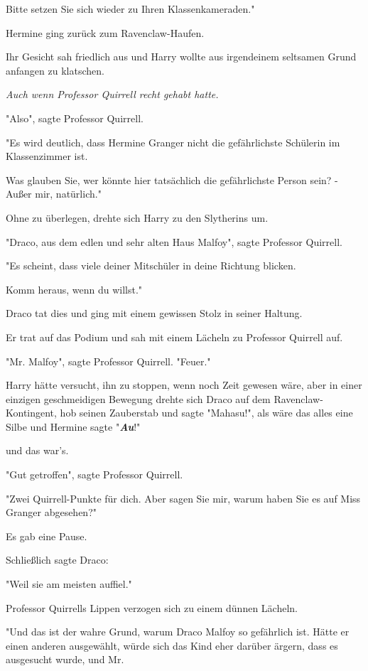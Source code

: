 {Bitte setzen Sie sich wieder zu Ihren Klassenkameraden."

Hermine ging zurück zum Ravenclaw-Haufen.

Ihr Gesicht sah friedlich aus und Harry wollte aus irgendeinem seltsamen Grund anfangen zu klatschen.

\emph{Auch wenn Professor Quirrell recht gehabt hatte.}

"Also", sagte Professor Quirrell.

"Es wird deutlich, dass Hermine Granger nicht die gefährlichste Schülerin im Klassenzimmer ist.

Was glauben Sie, wer könnte hier tatsächlich die gefährlichste Person sein? - Außer mir, natürlich."

Ohne zu überlegen, drehte sich Harry zu den Slytherins um.

"Draco, aus dem edlen und sehr alten Haus Malfoy", sagte Professor Quirrell.

"Es scheint, dass viele deiner Mitschüler in deine Richtung blicken.

Komm heraus, wenn du willst."

Draco tat dies und ging mit einem gewissen Stolz in seiner Haltung.

Er trat auf das Podium und sah mit einem Lächeln zu Professor Quirrell auf.

"Mr. Malfoy", sagte Professor Quirrell. "Feuer."

Harry hätte versucht, ihn zu stoppen, wenn noch Zeit gewesen wäre, aber in einer einzigen geschmeidigen Bewegung drehte sich Draco auf dem Ravenclaw-Kontingent, hob seinen Zauberstab und sagte "Mahasu!", als wäre das alles eine Silbe und Hermine sagte "\textbf{\emph{Au}}!"

und das war's.

"Gut getroffen", sagte Professor Quirrell.

"Zwei Quirrell-Punkte für dich. Aber sagen Sie mir, warum haben Sie es auf Miss Granger abgesehen?"

Es gab eine Pause.

Schließlich sagte Draco:

"Weil sie am meisten auffiel."

Professor Quirrells Lippen verzogen sich zu einem dünnen Lächeln.

"Und das ist der wahre Grund, warum Draco Malfoy so gefährlich ist. Hätte er einen anderen ausgewählt, würde sich das Kind eher darüber ärgern, dass es ausgesucht wurde, und Mr.

}
